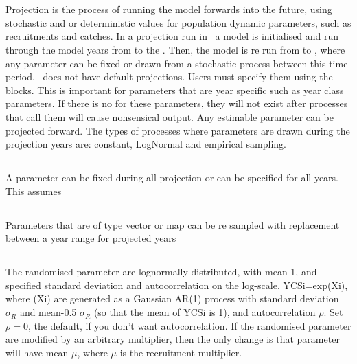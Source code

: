 \section{\label{sec:project-section}}

Projection is the process of running the model forwards into the future, using stochastic and or deterministic values for population dynamic parameters, such as recruitments and catches. In a projection run in \CNAME\, a model is initialised and run through the model years from  to the . Then, the model is re run from  to , where any parameter can be fixed or drawn from a stochastic process between this time period. \CNAME\ does not have default projections. Users must specify them using the  blocks. This is important for parameters that are year specific such as year class parameters. If there is no  for these parameters, they will not exist after  processes that call them will cause nonsensical output. Any estimable parameter can be projected forward. The types of processes where parameters are drawn during the projection years are: constant, LogNormal and empirical sampling.

\subsection*{}
A parameter can be fixed during all projection or can be specified for all years. This assumes 

\subsection*{}
Parameters that are of type vector or map can be re sampled with replacement between a year range for projected years
\subsection*{}
The randomised parameter are lognormally distributed, with mean 1, and specified standard deviation and autocorrelation on the log-scale. YCSi=exp(Xi), where (Xi) are generated as a Gaussian AR(1) process with standard deviation $\sigma_R$ and mean-0.5 $\sigma_R$ (so that the mean of YCSi is 1), and autocorrelation $\rho$. Set $\rho=0$, the default, if you don’t want autocorrelation. If the randomised parameter are modified by an arbitrary multiplier, then the only change is that parameter will have mean $\mu$, where $\mu$ is the recruitment multiplier.

